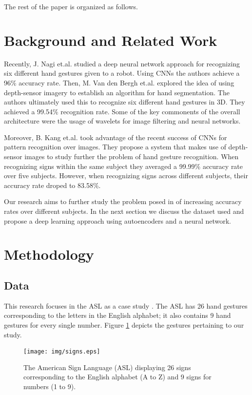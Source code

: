 \documentclass[a4paper]{article}
\begin{document}
The rest of the paper is organized as follows. 


\section{Background and Related Work}

Recently, J. Nagi et.al. \cite{nagi2011max} studied a deep neural network
approach for recognizing six different hand gestures given to a robot. Using
CNNs the authors achieve a 96\% accuracy rate. Then, M. Van den Bergh et.al.
\cite{van2011combining} explored the idea of using depth-sensor imagery to
establish an algorithm for hand segmentation. The authors ultimately used this
to recognize six different hand gestures in 3D. They achieved a 99.54\%
recognition rate. Some of the key commonents of the overall architecture were
the usage of wavelets for image filtering and neural networks.

Moreover, B. Kang et.al. \cite{kang2015real} took advantage of the recent
success of CNNs for pattern recognition over images. They propose a system that
makes use of depth-sensor images to study further the problem of hand gesture
recognition. When recognizing signs within the same subject they averaged a 99.99\%
accuracy rate over five subjects. However, when recognizing signs across
different subjects, their accuracy rate droped to 83.58\%. 

Our research aims to further study the problem posed in \cite{kang2015real} of
increasing accuracy rates over different subjects. In the next section we
discuss the dataset used and propose a deep learning approach using
autoencoders and a neural network. 


\section{Methodology}

\subsection{Data}

This research focuses in the ASL as a case study \cite{baker1980american}. 
The ASL has 26 hand gestures 
corresponding to the letters in the English alphabet; it also contains 9 hand
gestures for every single number. Figure \ref{fig:asl} 
depicts the gestures pertaining to our study.

\begin{figure}
\centering
\texttt{[image: img/signs.eps]}
\caption{The American Sign Language (ASL) displaying 26 signs corresponding to the
English alphabet (A to Z) and 9 signs for numbers (1 to 9).}
\label{fig:asl}
\end{figure}
\end{document}
